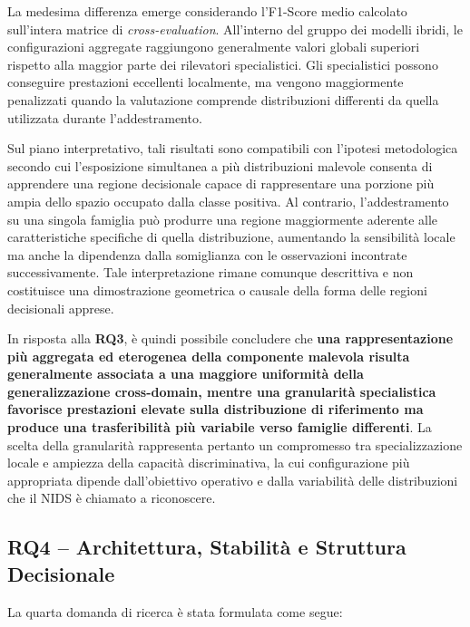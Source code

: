 La medesima differenza emerge considerando l'F1-Score medio calcolato sull'intera matrice di \textit{cross-evaluation}.
All'interno del gruppo dei modelli ibridi, le configurazioni aggregate raggiungono generalmente valori globali superiori rispetto alla maggior parte dei rilevatori specialistici.
Gli specialistici possono conseguire prestazioni eccellenti localmente, ma vengono maggiormente penalizzati quando la valutazione comprende distribuzioni differenti da quella utilizzata durante l'addestramento.

Sul piano interpretativo, tali risultati sono compatibili con l'ipotesi metodologica secondo cui l'esposizione simultanea a più distribuzioni malevole consenta di apprendere una regione decisionale capace di rappresentare una porzione più ampia dello spazio occupato dalla classe positiva.
Al contrario, l'addestramento su una singola famiglia può produrre una regione maggiormente aderente alle caratteristiche specifiche di quella distribuzione, aumentando la sensibilità locale ma anche la dipendenza dalla somiglianza con le osservazioni incontrate successivamente.
Tale interpretazione rimane comunque descrittiva e non costituisce una dimostrazione geometrica o causale della forma delle regioni decisionali apprese.

In risposta alla \textbf{RQ3}, è quindi possibile concludere che \textbf{una rappresentazione più aggregata ed eterogenea della componente malevola risulta generalmente associata a una maggiore uniformità della generalizzazione cross-domain, mentre una granularità specialistica favorisce prestazioni elevate sulla distribuzione di riferimento ma produce una trasferibilità più variabile verso famiglie differenti}.
La scelta della granularità rappresenta pertanto un compromesso tra specializzazione locale e ampiezza della capacità discriminativa, la cui configurazione più appropriata dipende dall'obiettivo operativo e dalla variabilità delle distribuzioni che il NIDS è chiamato a riconoscere.



\subsection{RQ4 -- Architettura, Stabilità e Struttura Decisionale}
\label{subsec:conclusioni_rq4}

La quarta domanda di ricerca è stata formulata come segue:

